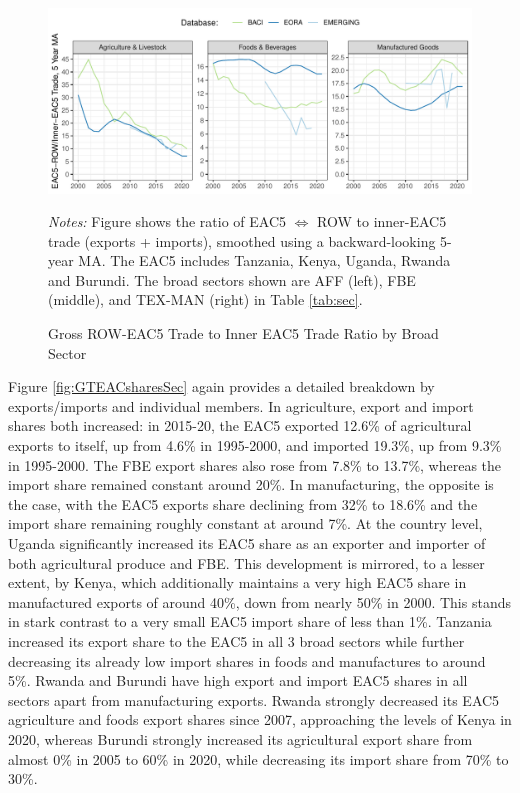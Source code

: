 \documentclass[a4paper]{article}
\begin{document}
\begin{figure}[h!]
\centering
\caption{\label{fig:EAC_ROW_Ratios_Sec} Gross ROW-EAC5 Trade to Inner EAC5 Trade Ratio by Broad Sector}
\includegraphics[width = \textwidth]{"ROW_EAC_Trade_Ratios_Sec_5YMA.pdf"}
\raggedright
\scriptsize 
\emph{Notes:} Figure shows the ratio of EAC5 $\Leftrightarrow$ ROW to inner-EAC5 trade (exports + imports), smoothed using a backward-looking 5-year MA. The EAC5 includes Tanzania, Kenya, Uganda, Rwanda and Burundi. The broad sectors shown are AFF (left), FBE (middle), and TEX-MAN (right) in Table \ref{tab:sec}.
\end{figure}

Figure \ref{fig:GTEACsharesSec} again provides a detailed breakdown by exports/imports and individual members. In agriculture, export and import shares both increased: in 2015-20, the EAC5 exported 12.6\% of agricultural exports to itself, up from 4.6\% in 1995-2000, and imported 19.3\%, up from 9.3\% in 1995-2000. The FBE export shares also rose from 7.8\% to 13.7\%, whereas the import share remained constant around 20\%. In manufacturing, the opposite is the case, with the EAC5 exports share declining from 32\% to 18.6\% and the import share remaining roughly constant at around 7\%. At the country level, Uganda significantly increased its EAC5 share as an exporter and importer of both agricultural produce and FBE. This development is mirrored, to a lesser extent, by Kenya, which additionally maintains a very high EAC5 share in manufactured exports of around 40\%, down from nearly 50\% in 2000. This stands in stark contrast to a very small EAC5 import share of less than 1\%. Tanzania increased its export share to the EAC5 in all 3 broad sectors while further decreasing its already low import shares in foods and manufactures to around 5\%. Rwanda and Burundi have high export and import EAC5 shares in all sectors apart from manufacturing exports. Rwanda strongly decreased its EAC5 agriculture and foods export shares since 2007, approaching the levels of Kenya in 2020, whereas Burundi strongly increased its agricultural export share from almost 0\% in 2005 to 60\% in 2020, while decreasing its import share from 70\% to 30\%. \newline 
\end{document}
